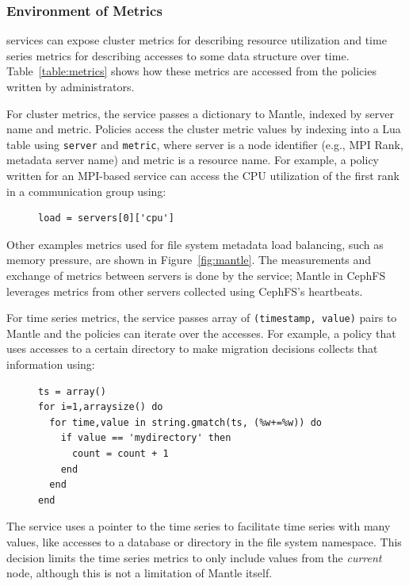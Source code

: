 \subsubsection{Environment of Metrics} services can expose cluster metrics for
describing resource utilization and time series metrics for describing accesses
to some data structure over time. Table~\ref{table:metrics} shows how these
metrics are accessed from the policies written by administrators. 

For cluster metrics, the service passes a dictionary to Mantle, indexed by
server name and metric. Policies access the cluster metric values by indexing
into a Lua table using \texttt{server} and \texttt{metric}, where server is a
node identifier ({e.g.}, MPI Rank, metadata server name) and metric is a
resource name.  For example, a policy written for an MPI-based service can
access the CPU utilization of the first rank in a communication group using:

\begin{figure}[h]
\footnotesize
\begin{verbatim}
load = servers[0]['cpu']
\end{verbatim}
\end{figure}

Other examples metrics used for file system metadata load balancing, such as
memory pressure, are shown in Figure~\ref{fig:mantle}. The measurements and
exchange of metrics between servers is done by the service; Mantle in CephFS
leverages metrics from other servers collected using CephFS's heartbeats.

For time series metrics, the service passes array of \texttt{(timestamp,
value)} pairs to Mantle and the policies can iterate over the accesses. For
example, a policy that uses accesses to a certain directory to make migration
decisions collects that information using:

\begin{figure}[h]
\footnotesize
\begin{verbatim}
ts = array()
for i=1,arraysize() do
  for time,value in string.gmatch(ts, (%w+=%w)) do
    if value == 'mydirectory' then
      count = count + 1
    end
  end
end
\end{verbatim}
\end{figure}

The service uses a pointer to the time series to facilitate time series with
many values, like accesses to a database or directory in the file system
namespace. This decision limits the time series metrics to only include values
from the {\it current } node, although this is not a limitation of Mantle
itself.

